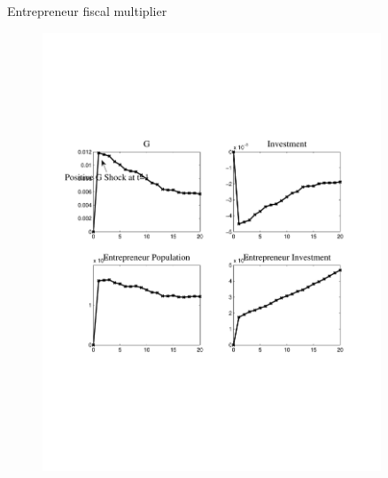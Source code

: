 \documentclass[svgnames]{beamer}
\begin{document}
\begin{frame}{Entrepreneur fiscal multiplier}
\begin{figure}[!ht]
\includegraphics[trim=1cm 6.5cm 1cm 6.5cm, clip=true, width=0.9\textwidth]{graph/GShockRes.pdf}
\end{figure}
\end{frame}
\end{document}
